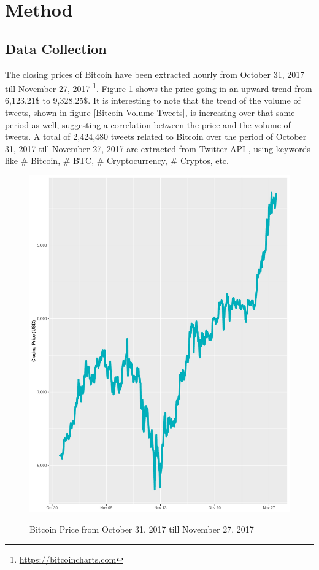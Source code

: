 \documentclass[conference]{IEEEtran}
\begin{document}
\section{Method}

\subsection{Data Collection}
\par The closing prices of Bitcoin have been extracted hourly from October 31, 2017 till November 27, 2017 \footnote{\url{https://bitcoincharts.com}}. Figure \ref{Bitcoin Price} shows the price going in an upward trend from 6,123.21\$ to 9,328.25\$. It is interesting to note that the trend of the volume of tweets, shown in figure \ref{Bitcoin Volume Tweets}, is increasing over that same period as well, suggesting a correlation between the price and the volume of tweets. A total of 2,424,480 tweets related to Bitcoin over the period  of October 31, 2017 till November 27, 2017 are extracted from Twitter API \cite{Twitter API}, using keywords like \# Bitcoin, \# BTC, \# Cryptocurrency, \# Cryptos, etc. 

\begin{minipage}{\linewidth}
\begin{figure}[H]
\centering
\caption{Bitcoin Price from October 31, 2017 till November 27, 2017} 
\includegraphics[scale=0.3]{Graphs/BitcoinPriceChart.pdf}
\label{Bitcoin Price} 
\end{figure}
\end{minipage}
\end{document}
